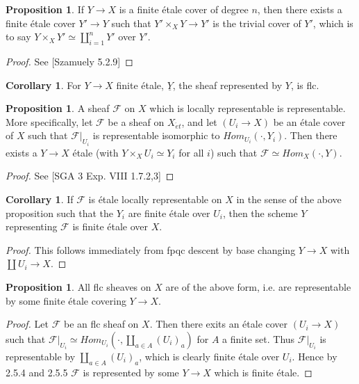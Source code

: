 \documentclass{ucbthesis}
\theoremstyle{definition}
\theoremstyle{theorem}
\newtheorem{cor}[thm]{Corollary}
\newtheorem{prop}[thm]{Proposition}
\begin{document}
\begin{prop}
If $Y\rightarrow X$ is a finite \'{e}tale cover of degree $n$, then there exists a finite \'{e}tale cover $Y' \rightarrow Y$  such that $Y'\times_{X}Y\rightarrow Y'$ is the trivial cover of $Y'$, which is to say $Y\times_{X}Y' \simeq \coprod\limits_{i=1}^{n}Y'$ over $Y'$. 
\end{prop}
\begin{proof}
See [Szamuely 5.2.9]
\end{proof}

\begin{cor}
For $Y\rightarrow X$ finite \'{e}tale, $\underline{Y}$, the sheaf represented by $Y$, is flc. 
\end{cor}

\begin{prop}
A sheaf $\mathcal{F}$ on $X$ which is locally representable is representable. More specifically, let $\mathcal{F}$ be a sheaf on $X_{\acute{e}t}$, and let $(U_{i}\rightarrow X)$ be an \'{e}tale cover of $X$ such that $\mathcal{F}|_{U_{i}}$ is representable isomorphic to $Hom_{U_{i}}(\cdot,Y_{i})$. Then there exists a $Y\rightarrow X$ \'{e}tale (with $Y\times_{X}{U_{i}} \simeq Y_{i}$ for all $i$) such that $\mathcal{F} \simeq Hom_{X}(\cdot, Y)$. 
\end{prop}
\begin{proof}
See [SGA 3 Exp. VIII 1.7.2,3]
\end{proof}


\begin{cor}
If $\mathcal{F}$ is \'{e}tale locally representable on $X$ in the sense of the above proposition such that the $Y_{i}$ are finite \'{e}tale over $U_{i}$, then the scheme $Y$ representing $\mathcal{F}$ is finite \'{e}tale over $X$. 
\end{cor}
\begin{proof}
This follows immediately from fpqc descent by base changing $Y\rightarrow X$ with $\coprod U_{i} \rightarrow X$. 
\end{proof}


\begin{prop}
All flc sheaves on $X$ are of the above form, i.e. are representable by some finite \'{e}tale covering $Y\rightarrow X$.
\end{prop}

\begin{proof}
Let $\mathcal{F}$ be an flc sheaf on $X$. Then there exits an \'{e}tale cover $(U_{i}\rightarrow X)$ such that $\mathcal{F}|_{U_{i}}\simeq Hom_{U_{i}}(\cdot, \coprod_{a\in A} (U_{i})_{a})$ for $A$ a finite set. Thus $\mathcal{F}|_{U_{i}}$ is representable by $\coprod\limits_{a\in A} (U_{i})_{a}$, which is clearly finite \'{e}tale over $U_{i}$. Hence by 2.5.4 and 2.5.5 $\mathcal{F}$ is represented by some $Y\rightarrow X$ which is finite \'{e}tale.  
\end{proof}
\end{document}
